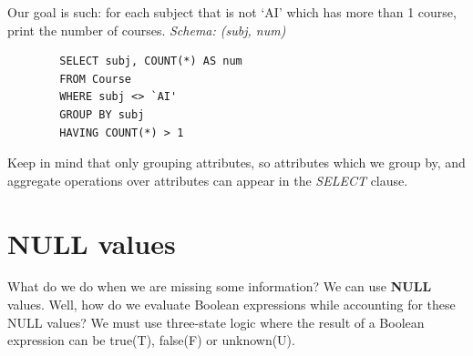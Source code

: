 \documentclass{article}
\begin{document}
Our goal is such: for each subject that is not `AI' which has more than 1 course, print the number of courses. \textit{Schema: (subj, num)}

\begin{tcolorbox}
    \begin{verbatim}
        SELECT subj, COUNT(*) AS num
        FROM Course
        WHERE subj <> `AI'
        GROUP BY subj
        HAVING COUNT(*) > 1
    \end{verbatim}
\end{tcolorbox}

Keep in mind that only grouping attributes, so attributes which we group by, and aggregate operations over attributes can appear in the \textit{SELECT} clause.

\section*{NULL values}

What do we do when we are missing some information? We can use \textbf{NULL} values. Well, how do we evaluate Boolean expressions while accounting for these NULL values? We must use three-state logic where the result of a Boolean expression can be true(T), false(F) or unknown(U).
\end{document}
